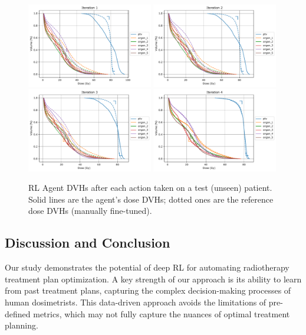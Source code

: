 \begin{figure}
	\centering
	\includegraphics[width=0.49\textwidth]{AIME/distance-test-w1.pdf}
	\includegraphics[width=0.49\textwidth]{AIME/distance-test-w2.pdf}
	\includegraphics[width=0.49\textwidth]{AIME/distance-test-w3.pdf}
	\includegraphics[width=0.49\textwidth]{AIME/distance-test-w4.pdf}
	\caption{
		RL Agent DVHs after each action taken on a test (unseen) patient.
		Solid lines are the agent's dose DVHs; dotted ones are the reference dose DVHs (manually fine-tuned).
	}
	\label{fig:steps}
\end{figure}

\subsection{Discussion and Conclusion}
Our study demonstrates the potential of deep RL for automating radiotherapy treatment plan optimization.
A key strength of our approach is its ability to learn from past treatment plans, capturing the complex decision-making processes of human dosimetrists.
This data-driven approach avoids the limitations of pre-defined metrics, which may not fully capture the nuances of optimal treatment planning.

